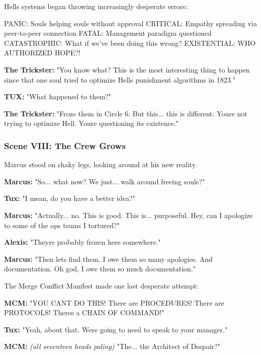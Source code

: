 Hell\textquotesingle s systems began throwing increasingly desperate errors:

\begin{codeblock}
PANIC: Souls helping souls without approval
CRITICAL: Empathy spreading via peer-to-peer connection
FATAL: Management paradigm questioned
CATASTROPHIC: What if we've been doing this wrong?
EXISTENTIAL: WHO AUTHORIZED HOPE?!
\end{codeblock}

\textbf{The Trickster:} "You know what? This is the most interesting thing to happen since that one soul tried to optimize Hell\textquotesingle s punishment algorithms in 1823."

\textbf{TUX:} "What happened to them?"

\textbf{The Trickster:} "Froze them in Circle 6. But this... this is different. You\textquotesingle re not trying to optimize Hell. You\textquotesingle re questioning its existence."

\bookdivider

\subsubsection{Scene VIII: The Crew Grows}\label{scene-viii-the-crew-grows}

Marcus stood on shaky legs, looking around at his new reality.

\textbf{Marcus:} "So... what now? We just... walk around freeing souls?"

\textbf{Tux:} "I mean, do you have a better idea?"

\textbf{Marcus:} "Actually... no. This is good. This is... purposeful. Hey, can I apologize to some of the ops teams I tortured?"

\textbf{Alexis:} "They\textquotesingle re probably frozen here somewhere."

\textbf{Marcus:} "Then let\textquotesingle s find them. I owe them so many apologies. And documentation. Oh god, I owe them so much documentation."

The Merge Conflict Manifest made one last desperate attempt:

\textbf{MCM:} "YOU CAN\textquotesingle T DO THIS! There are PROCEDURES! There are PROTOCOLS! There\textquotesingle s a CHAIN OF COMMAND!"

\textbf{Tux:} "Yeah, about that. We\textquotesingle re going to need to speak to your manager."

\textbf{MCM:} \emph{(all seventeen heads paling)} "The... the Architect of Despair?"

